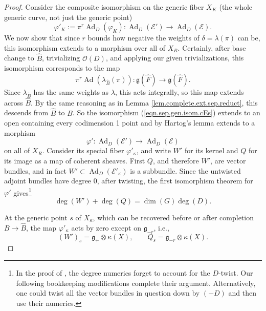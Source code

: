 \documentclass[openany]{amsbook}
\theoremstyle{definition}
\theoremstyle{remark}
\numberwithin{equation}{section}
\renewcommand{\O}{\mathcal{O}}
\newcommand{\cE}{\mathcal{E}}
\renewcommand{\phi}{\varphi}
\renewcommand{\-}{\operatorname{-}}
\newcommand{\on}[1]{\operatorname{#1}}
\renewcommand{\fg}{\mathfrak{g}}
\newcommand{\Ad}{\on{Ad}}
\begin{document}
\begin{proof}
Consider the composite isomorphism on the generic fiber $X_K$ (the whole generic curve, not just the generic point)
\begin{equation}
    \phi'_K := \pi^r \Ad_D(\phi_K) : \Ad_D(\cE') \to \Ad_D(\cE).\label{eqn.sep.gen.isom.cEs}
\end{equation}
We now show that since $r$ bounds how negative the weights of $\delta = \lambda(\pi)$ can be, this isomorphism extends to a morphism over all of $X_R$. Certainly, after base change to $\widehat{B}$, trivializing $\O(D)$, and applying our given trivializations, this isomorphism corresponds to the map
$$
    \pi^r \Ad(\lambda_{\widehat{B}}(\pi)) : \fg(\widehat{F}) \to \fg(\widehat{F}).
$$
Since $\lambda_{\widehat{B}}$ has the same weights as $\lambda$, this acts integrally, so this map extends across $\widehat{B}$. By the same reasoning as in Lemma \ref{lem.complete.ext.sep.reduct}, this descends from $\widehat{B}$ to $B$. So the isomorphism (\ref{eqn.sep.gen.isom.cEs}) extends to an open containing every codimension 1 point and by Hartog's lemma extends to a morphism $$\phi' : \Ad_D(\cE') \to \Ad_D(\cE)$$ on all of $X_R$. Consider its special fiber $\phi'_{\kappa}$, and write $W'$ for its kernel and $Q$ for its image as a map of coherent sheaves. First $Q$, and therefore $W'$, are vector bundles, and in fact $W' \subset \Ad_D(\cE'_{\kappa})$ is a subbundle. Since the untwisted adjoint bundles have degree 0, after twisting, the first isomorphism theorem for $\phi'$ gives\footnote{In the proof of \cite[\S 9.4]{CLI}, the degree numerics forget to account for the $D$-twist. Our following bookkeeping modifications complete their argument. Alternatively, one could twist all the vector bundles in question down by $(-D)$ and then use their numerics.}
$$
    \deg(W') + \deg(Q) = \dim(G) \deg(D).
$$

At the generic point $s$ of $X_{\kappa}$, which can be recovered before or after completion $B \to \widehat{B}$, the map $\phi'_{\kappa}$ acts by zero except on $\fg_{-r}$, i.e.,
$$
    (W')_s = \fg_+ \otimes \kappa(X), \qquad Q_s = \fg_{-r} \otimes \kappa(X).
$$


\end{proof}
\end{document}
